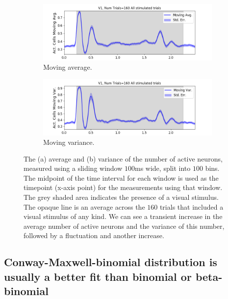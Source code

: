 \documentclass[a4paper,12pt]{article}
\theoremstyle{definition}
\begin{document}
  \newpage

  \begin{figure}[h]
    \begin{subfigure}[h]{\linewidth}
      \includegraphics[width=\linewidth]{figures/v1_1ms_moving_avg_all_stimulated_trials.png}
      \caption{Moving average.}
      \label{fig:moving_avg_num_active_cells}
    \end{subfigure}
    \begin{subfigure}[h]{\linewidth}
      \includegraphics[width=\linewidth]{figures/v1_1ms_moving_var_all_stimulated_trials.png}
      \caption{Moving variance.}
      \label{fig:moving_var_num_active_cells}
    \end{subfigure}
    \caption{The (a) average and (b) variance of the number of active neurons, measured using a sliding window $100$ms wide, split into $100$ bins. The midpoint of the time interval for each window is used as the timepoint (x-axis point) for the measurements using that window. The grey shaded area indicates the presence of a visual stimulus. The opaque line is an average across the $160$ trials that included a visual stimulus of any kind. We can see a transient increase in the average number of active neurons and the variance of this number, followed by a fluctuation and another increase.}
    \label{fig:moving_avg_and_var}
  \end{figure}

  \newpage

  \subsection{Conway-Maxwell-binomial distribution is usually a better fit than binomial or beta-binomial}
\end{document}
